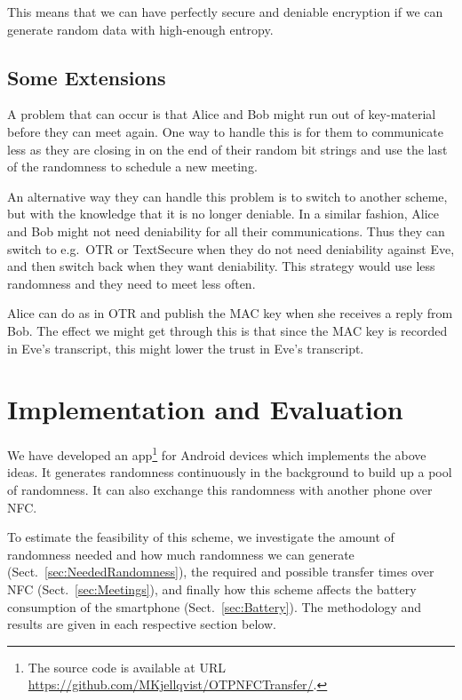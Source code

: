 This means that we can have perfectly secure and deniable encryption if we can 
generate random data with high-enough entropy.

\subsection{Some Extensions}

A problem that can occur is that Alice and Bob might run out of key-material 
before they can meet again.
One way to handle this is for them to communicate less as they are closing in 
on the end of their random bit strings and use the last of the randomness to 
schedule a new meeting.

An alternative way they can handle this problem is to switch to another scheme, 
but with the knowledge that it is no longer deniable.
In a similar fashion, Alice and Bob might not need deniability for all their 
communications.
Thus they can switch to e.g.~\ac{OTR} or TextSecure when they do not need 
deniability against Eve, and then switch back when they want deniability.
This strategy would use less randomness and they need to meet less often.

Alice can do as in \ac{OTR} and publish the \ac{MAC} key when she receives 
a reply from Bob.
The effect we might get through this is that since the \ac{MAC} key is recorded 
in Eve's transcript, this might lower the trust in Eve's transcript.


\section{Implementation and Evaluation}

We have developed an app\footnote{%
  The source code is available at URL 
  \url{https://github.com/MKjellqvist/OTPNFCTransfer/}.
} for Android devices which implements the above ideas.
It generates randomness continuously in the background to build up a pool of 
randomness.
It can also exchange this randomness with another phone over \ac{NFC}.

To estimate the feasibility of this scheme, we investigate the amount of 
randomness needed and how much randomness we can generate 
(Sect.~\ref{sec:NeededRandomness}), the required and possible transfer times 
over \ac{NFC} (Sect.~\ref{sec:Meetings}), and finally how this scheme affects 
the battery consumption of the smartphone (Sect.~\ref{sec:Battery}).
The methodology and results are given in each respective section below.

